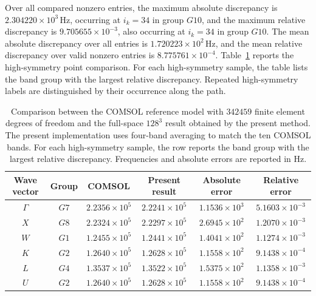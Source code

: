 \documentclass[11pt,oneside]{article}
\numberwithin{equation}{section}
\theoremstyle{plain}
\theoremstyle{remark}
\begin{document}
Over all compared nonzero entries, the maximum absolute discrepancy is \(2.304220\times10^3\,\mathrm{Hz}\), occurring at \(i_k=34\) in group \(G10\), and the maximum relative discrepancy is \(9.705655\times10^{-3}\), also occurring at \(i_k=34\) in group \(G10\). The mean absolute discrepancy over all entries is \(1.720223\times10^2\,\mathrm{Hz}\), and the mean relative discrepancy over valid nonzero entries is \(8.775761\times10^{-4}\). Table~\ref{tab:comsol_code_comparison} reports the high-symmetry point comparison. For each high-symmetry sample, the table lists the band group with the largest relative discrepancy. Repeated high-symmetry labels are distinguished by their occurrence along the path.

\begin{table}[htbp]
\centering
\caption{Comparison between the COMSOL reference model with \(342459\) finite element degrees of freedom and the full-space \(128^3\) result obtained by the present method. The present implementation uses four-band averaging to match the ten COMSOL bands. For each high-symmetry sample, the row reports the band group with the largest relative discrepancy. Frequencies and absolute errors are reported in Hz.}
\label{tab:comsol_code_comparison}
\small
\renewcommand{\arraystretch}{1.12}
\begin{tabular}{cccccc}
\toprule
Wave vector & Group & COMSOL & Present result & Absolute error & Relative error \\
\midrule
\(\Gamma\) & \(G7\)  & \(2.2356\times10^5\) & \(2.2241\times10^5\) & \(1.1536\times10^3\) & \(5.1603\times10^{-3}\) \\
\(X\)        & \(G8\)  & \(2.2324\times10^5\) & \(2.2297\times10^5\) & \(2.6945\times10^2\) & \(1.2070\times10^{-3}\) \\
\(W\)      & \(G1\)  & \(1.2455\times10^5\) & \(1.2441\times10^5\) & \(1.4041\times10^2\) & \(1.1274\times10^{-3}\) \\
\(K\)      & \(G2\)  & \(1.2640\times10^5\) & \(1.2628\times10^5\) & \(1.1558\times10^2\) & \(9.1438\times10^{-4}\) \\
\(L\)      & \(G4\)  & \(1.3537\times10^5\) & \(1.3522\times10^5\) & \(1.5375\times10^2\) & \(1.1358\times10^{-3}\) \\
\(U\)        & \(G2\)  & \(1.2640\times10^5\) & \(1.2628\times10^5\) & \(1.1558\times10^2\) & \(9.1438\times10^{-4}\) \\
\bottomrule
\end{tabular}
\end{table}
\end{document}
